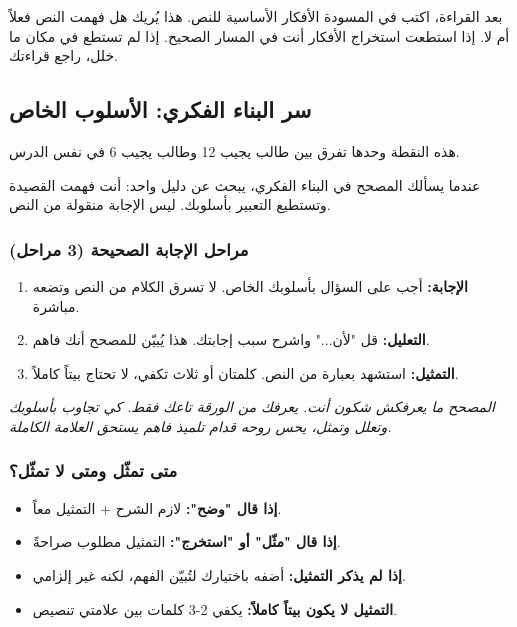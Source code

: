 \documentclass[12pt,a4paper]{book}
\newcommand{\quoteAr}[1]{%
	\begin{myquote}
		\itshape #1
	\end{myquote}
}
\begin{document}
	بعد القراءة، اكتب في المسودة الأفكار الأساسية للنص. هذا يُريك هل فهمت النص فعلاً أم لا. إذا استطعت استخراج الأفكار أنت في المسار الصحيح. إذا لم تستطع في مكان ما خلل، راجع قراءتك.
	
	\subsection{سر البناء الفكري: الأسلوب الخاص}
	
	هذه النقطة وحدها تفرق بين طالب يجيب 12 وطالب يجيب 6 في نفس الدرس.
	
	عندما يسألك المصحح في البناء الفكري، يبحث عن دليل واحد: أنت فهمت القصيدة وتستطيع التعبير بأسلوبك. ليس الإجابة منقولة من النص.
	
	\subsubsection*{مراحل الإجابة الصحيحة (3 مراحل)}
	
	\begin{enumerate}
		\item \textbf{الإجابة:} أجب على السؤال بأسلوبك الخاص. لا تسرق الكلام من النص وتضعه مباشرة.
		\item \textbf{التعليل:} قل "لأن..." واشرح سبب إجابتك. هذا يُبيّن للمصحح أنك فاهم.
		\item \textbf{التمثيل:} استشهد بعبارة من النص. كلمتان أو ثلاث تكفي، لا تحتاج بيتاً كاملاً.
	\end{enumerate}
	
	\quoteAr{المصحح ما يعرفكش شكون أنت. يعرفك من الورقة تاعك فقط. كي تجاوب بأسلوبك وتعلل وتمثل، يحس روحه قدام تلميذ فاهم يستحق العلامة الكاملة.}
	
	\subsubsection*{متى تمثّل ومتى لا تمثّل؟}
	
	\begin{itemize}
		\item \textbf{إذا قال "وضح":} لازم الشرح + التمثيل معاً.
		\item \textbf{إذا قال "مثّل" أو "استخرج":} التمثيل مطلوب صراحةً.
		\item \textbf{إذا لم يذكر التمثيل:} أضفه باختيارك لتُبيّن الفهم، لكنه غير إلزامي.
		\item \textbf{التمثيل لا يكون بيتاً كاملاً:} يكفي 2-3 كلمات بين علامتي تنصيص.
	\end{itemize}
	
\end{document}
